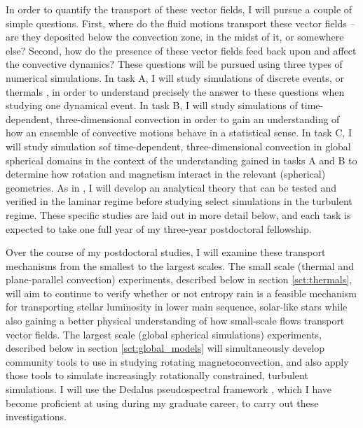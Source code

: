 \documentclass[aasms,12pt]{article}
\begin{document}
In order to quantify the transport of these vector fields, I will pursue a couple of simple questions.
First, where do the fluid motions transport these vector fields -- are they deposited below the convection zone, in the midst of it, or somewhere else?
Second, how do the presence of these vector fields feed back upon and affect the convective dynamics?
These questions will be pursued using three types of numerical simulations.
In task A, I will study simulations of discrete events, or thermals \citep[as in ][]{andersLB2019}, in order to understand precisely the answer to these questions when studying one dynamical event.
In task B, I will study simulations of time-dependent, three-dimensional convection \citep[as in ][]{anders&brown2017} in order to gain an understanding of how an ensemble of convective motions behave in a statistical sense.
In task C, I will study simulation sof time-dependent, three-dimensional convection in global spherical domains in the context of the understanding gained in tasks A and B to determine how rotation and magnetism interact in the relevant (spherical) geometries.
As in \citet{andersLB2019}, I will develop an analytical theory that can be tested and verified in the laminar regime before studying select simulations in the turbulent regime.
These specific studies are laid out in more detail below, and each task is expected to take one full year of my three-year postdoctoral fellowship.

Over the course of my postdoctoral studies, I will examine these transport mechanisms from the smallest to the largest scales.
The small scale (thermal and plane-parallel convection) experiments, described below in section \ref{sct:thermals}, will aim to continue to verify whether or not entropy rain is a feasible mechanism for transporting stellar luminosity in lower main sequence, solar-like stars while also gaining a better physical understanding of how small-scale flows transport vector fields.
The largest scale (global spherical simulations) experiments, described below in section \ref{sct:global_models} will simultaneously develop community tools to use in studying rotating magnetoconvection, and also apply those tools to simulate increasingly rotationally constrained, turbulent simulations.
I will use the Dedalus pseudospectral framework \citep{burns&all2019}, which I have become proficient at using during my graduate career, to carry out these investigations.
\end{document}
